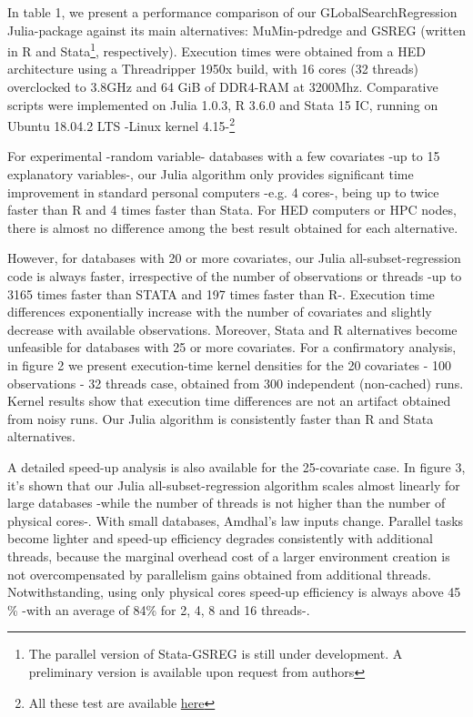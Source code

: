 \documentclass{juliacon}
\begin{document}
In table 1, we present a performance comparison of our GLobalSearchRegression Julia-package against its main alternatives: MuMin-pdredge and GSREG (written in R and Stata\footnote{The parallel version of Stata-GSREG is still under development. A preliminary version is available upon request from authors}, respectively).
Execution times were obtained from a HED architecture using a Threadripper 1950x build, with 16 cores (32 threads) overclocked to 3.8GHz and 64 GiB of DDR4-RAM at 3200Mhz. Comparative scripts were implemented on Julia 1.0.3, R 3.6.0 and Stata 15 IC, running on Ubuntu 18.04.2 LTS -Linux kernel 4.15-\footnote{All these test are available \href{https://github.com/ParallelGSReg/GlobalSearchRegression.jl/tree/master/juliacon2019proceedings/reproducibility}{here}} \vskip 6pt

For experimental -random variable- databases with a few covariates -up to 15 explanatory variables-, our Julia algorithm only provides significant time improvement in standard personal computers -e.g. 4 cores-, being up to twice faster than R and 4 times faster than Stata. For HED computers or HPC nodes, there is almost no difference among the best result obtained for each alternative. \vskip 6pt


However, for databases with 20 or more covariates, our Julia all-subset-regression code is always faster, irrespective of the number of observations or threads -up to 3165 times faster than STATA and 197 times faster than R-. Execution time differences exponentially increase with the number of covariates and slightly decrease with available observations. Moreover, Stata and R alternatives become unfeasible for databases with 25 or more covariates. For a confirmatory analysis, in figure 2 we present execution-time kernel densities for the 20 covariates - 100 observations - 32 threads case, obtained from 300 independent (non-cached) runs. Kernel results show that execution time differences are not an artifact obtained from noisy runs. Our Julia algorithm is consistently faster than R and Stata alternatives. \vskip 6pt

A detailed speed-up analysis is also available for the 25-covariate case. In figure 3, it's shown that our Julia all-subset-regression algorithm scales almost linearly for large databases -while the number of threads is not higher than the number of physical cores-. With small databases, Amdhal's law \cite{Amdahl1967} inputs change. Parallel tasks become lighter and speed-up efficiency degrades consistently with additional threads, because the marginal overhead cost of a larger environment creation is not overcompensated by parallelism gains obtained from additional threads. Notwithstanding, using only physical cores speed-up efficiency is always above 45 \%  -with an average of 84\% for 2, 4, 8 and 16 threads-. 
\end{document}
